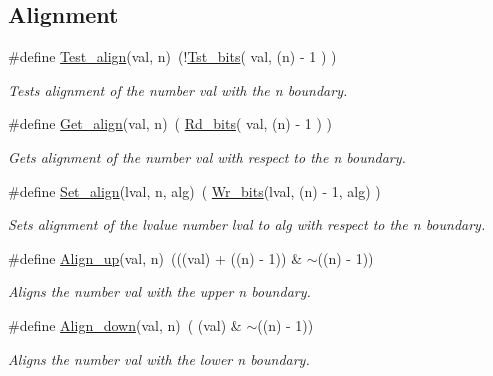 \subsection*{Alignment}
\begin{DoxyCompactItemize}
\item 
\#define \hyperlink{group__group__sam0__utils_gad490b657cb147d3d1773f6559559b98b}{Test\+\_\+align}(val,  n)~(!\hyperlink{group__group__sam0__utils_gab1e92741077b101e6b2df74880e71e96}{Tst\+\_\+bits}( val, (n) -\/ 1     )   )
\begin{DoxyCompactList}\small\item\em Tests alignment of the number {\itshape val} with the {\itshape n} boundary. \end{DoxyCompactList}\item 
\#define \hyperlink{group__group__sam0__utils_ga526bddb313be14057f5d65e199f6d814}{Get\+\_\+align}(val,  n)~(  \hyperlink{group__group__sam0__utils_ga53d9294b7065346ffa04d7991d2bc31e}{Rd\+\_\+bits}( val, (n) -\/ 1     )   )
\begin{DoxyCompactList}\small\item\em Gets alignment of the number {\itshape val} with respect to the {\itshape n} boundary. \end{DoxyCompactList}\item 
\#define \hyperlink{group__group__sam0__utils_gad607b0e4ad3cf4cb5bd7a3619742f092}{Set\+\_\+align}(lval,  n,  alg)~(  \hyperlink{group__group__sam0__utils_ga97b2bc0b5cdc7ec5293b7a5304cee0f0}{Wr\+\_\+bits}(lval, (n) -\/ 1, alg)   )
\begin{DoxyCompactList}\small\item\em Sets alignment of the lvalue number {\itshape lval} to {\itshape alg} with respect to the {\itshape n} boundary. \end{DoxyCompactList}\item 
\#define \hyperlink{group__group__sam0__utils_gab21656217d07b4ff1ecaabc63021feec}{Align\+\_\+up}(val,  n)~(((val) + ((n) -\/ 1)) \& $\sim$((n) -\/ 1))
\begin{DoxyCompactList}\small\item\em Aligns the number {\itshape val} with the upper {\itshape n} boundary. \end{DoxyCompactList}\item 
\#define \hyperlink{group__group__sam0__utils_ga1070d94a69b4e1955ac1723b4f382095}{Align\+\_\+down}(val,  n)~( (val)              \& $\sim$((n) -\/ 1))
\begin{DoxyCompactList}\small\item\em Aligns the number {\itshape val} with the lower {\itshape n} boundary. \end{DoxyCompactList}\end{DoxyCompactItemize}
